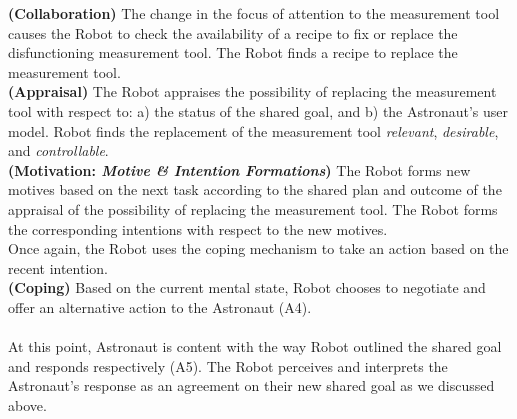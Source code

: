 \noindent\textbf{(Collaboration)} The change in the focus of attention to the
measurement tool causes the Robot to check the availability of a recipe to fix
or replace the disfunctioning measurement tool. The Robot finds a recipe to
replace the measurement tool.\\

\noindent\textbf{(Appraisal)} The Robot appraises the possibility of
replacing the measurement tool with respect to: a) the status of the shared
goal, and b) the Astronaut's user model. Robot finds the replacement of the
measurement tool \textit{relevant}, \textit{desirable}, and
\textit{controllable}.\\

\noindent\textbf{(Motivation: \textit{Motive \& Intention Formations})} The
Robot forms new motives based on the next task according to the shared plan and
outcome of the appraisal of the possibility of replacing the measurement tool.
The Robot forms the corresponding intentions with respect to the new motives.\\

\noindent Once again, the Robot uses the coping mechanism to take an action
based on the recent intention.\\

\noindent\textbf{(Coping)} Based on the current mental state, Robot
chooses to negotiate and offer an alternative action to the Astronaut (A4).\\

\noindent{}\\

At this point, Astronaut is content with the way Robot outlined the shared goal
and responds respectively (A5). The Robot perceives and interprets the
Astronaut's response as an agreement on their new shared goal as we discussed
above.\\

\noindent{}

